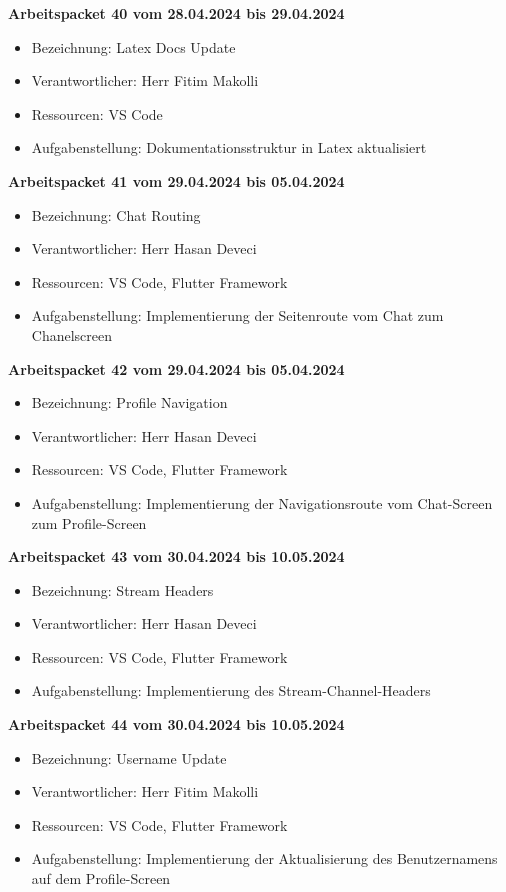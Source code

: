 \textbf{Arbeitspacket 40 vom 28.04.2024 bis 29.04.2024}
\begin{itemize}[itemsep=0pt]
    \item{Bezeichnung: Latex Docs Update} 
	\item{Verantwortlicher: Herr Fitim Makolli} 
	\item{Ressourcen: VS Code} 
    \item{Aufgabenstellung: Dokumentationsstruktur in Latex aktualisiert}
\end{itemize} 

\textbf{Arbeitspacket 41 vom 29.04.2024 bis 05.04.2024}
\begin{itemize}[itemsep=0pt]
    \item{Bezeichnung: Chat Routing} 
	\item{Verantwortlicher: Herr Hasan Deveci} 
	\item{Ressourcen: VS Code, Flutter Framework} 
    \item{Aufgabenstellung: Implementierung der Seitenroute vom Chat zum Chanelscreen}
\end{itemize} 

\textbf{Arbeitspacket 42 vom 29.04.2024 bis 05.04.2024}
\begin{itemize}[itemsep=0pt]
    \item{Bezeichnung: Profile Navigation} 
	\item{Verantwortlicher: Herr Hasan Deveci} 
	\item{Ressourcen: VS Code, Flutter Framework} 
    \item{Aufgabenstellung: Implementierung der Navigationsroute vom Chat-Screen zum Profile-Screen}
\end{itemize} 

\textbf{Arbeitspacket 43 vom 30.04.2024 bis 10.05.2024}
\begin{itemize}[itemsep=0pt]
    \item{Bezeichnung: Stream Headers} 
	\item{Verantwortlicher: Herr Hasan Deveci} 
	\item{Ressourcen: VS Code, Flutter Framework} 
    \item{Aufgabenstellung: Implementierung des Stream-Channel-Headers}
\end{itemize} 

\textbf{Arbeitspacket 44 vom 30.04.2024 bis 10.05.2024}
\begin{itemize}[itemsep=0pt]
    \item{Bezeichnung: Username Update} 
	\item{Verantwortlicher: Herr Fitim Makolli} 
	\item{Ressourcen: VS Code, Flutter Framework} 
    \item{Aufgabenstellung: Implementierung der Aktualisierung des Benutzernamens auf dem Profile-Screen}
\end{itemize} 

